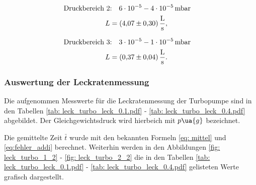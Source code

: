 \begin{align}
  \label{eq:turbo_leit_2}
  \begin{aligned}
    \text{Druckbereich 2} &\text{:}\quad \num{6e-5} - \num{4e-05} \, \text{mbar}& \\
   L&=\SI{4.07\pm 0.30}{\litre\per\second},
\end{aligned}
\end{align}

\begin{align}
  \label{eq:turbo_leit_3}
  \begin{aligned}
    \text{Druckbereich 3} &\text{:}\quad \num{3e-5} - \num{1e-05} \, \text{mbar}& \\
   L&=\SI{0.37\pm 0.04}{\litre\per\second}.
\end{aligned}
\end{align}

\subsubsection{Auswertung der Leckratenmessung}

Die aufgenommen Messwerte für die Leckratenmessung der Turbopumpe sind in den Tabellen \ref{tab: leck_turbo_leck_0.1.pdf} - \ref{tab: leck_turbo_leck_0.4.pdf}
abgebildet. Der Gleichgewichtsdruck wird hierbeich mit $p\ua{g}$ bezeichnet.




Die gemittelte Zeit $\bar{t}$ wurde mit den bekannten Formeln \eqref{eq: mittel} und \eqref{eq:fehler_addi} berechnet.
Weiterhin werden in den Abbildungen \ref{fig: leck_turbo_1_2} - \ref{fig: leck_turbo_2_2} die in den Tabellen \ref{tab: leck_turbo_leck_0.1.pdf} - \ref{tab: leck_turbo_leck_0.4.pdf}
gelisteten Werte grafisch dargestellt.

